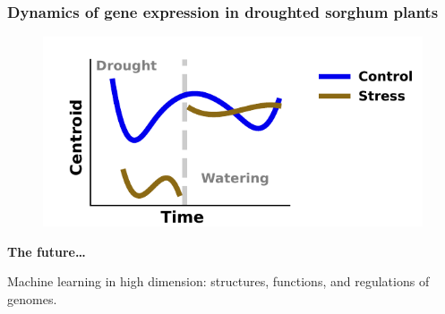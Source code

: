 \documentclass[11pt,xcolor=dvipsnames]{beamer}
\begin{document}
\begin{frame}
\frametitle{Dynamics of gene expression in droughted sorghum plants}
\begin{figure}
\includegraphics[width=0.6\linewidth]{figures/amf_centroids.pdf}
\end{figure}

\vspace{1.5em}
\begin{overlayarea}{12cm}{5cm}
\end{overlayarea}
\end{frame}





\begin{frame}
\Large{ \bf
The future…}

\begin{flushright}
\vspace{1em}
\small
Machine learning in high dimension: structures, functions, and regulations of
genomes.

\end{flushright}

\end{frame}
\end{document}
